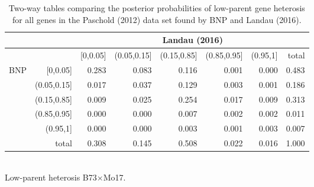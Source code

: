 \begin{table}[ht]
\footnotesize
\centering
\caption{Two-way tables comparing the posterior probabilities of low-parent gene heterosis for all genes in the Paschold (2012) data set found by BNP and Landau (2016).}
\label{bayes-compare1}
\begin{tabular}{rrrrrrr|r}
&  &\multicolumn{6}{c}{Landau (2016)}\\
  \toprule
&  & [0,0.05] & (0.05,0.15] & (0.15,0.85] & (0.85,0.95] & (0.95,1] & total \\
  \midrule
\multirow{6}{*}{BNP} & [0,0.05]    & 0.283 & 0.083 & 0.116 & 0.001 & 0.000 & 0.483 \\
                     & (0.05,0.15] & 0.017 & 0.037 & 0.129 & 0.003 & 0.001 & 0.186 \\
                     & (0.15,0.85] & 0.009 & 0.025 & 0.254 & 0.017 & 0.009 & 0.313 \\
                     & (0.85,0.95] & 0.000 & 0.000 & 0.007 & 0.002 & 0.002 & 0.011 \\
                     & (0.95,1]    & 0.000 & 0.000 & 0.003 & 0.001 & 0.003 & 0.007 \\
                     \midrule
                     & total       & 0.308 & 0.145 & 0.508 & 0.022 & 0.016 & 1.000 \\
   \bottomrule
\end{tabular}
\\[.5cm]
Low-parent heterosis B73$\times$Mo17.
\\[.75cm]


\end{table}
